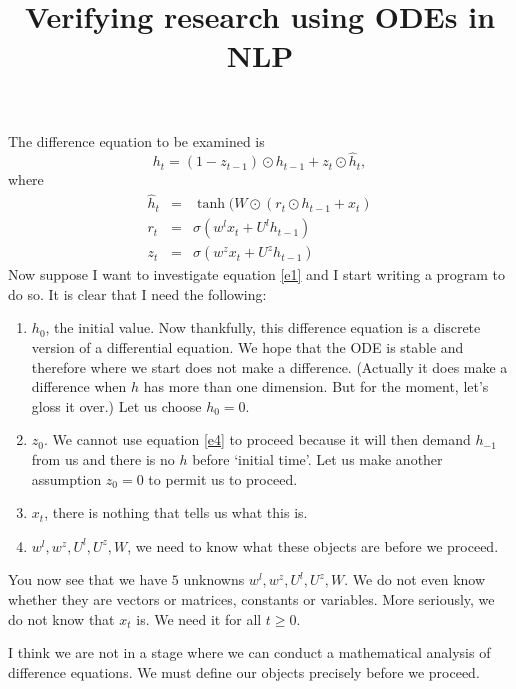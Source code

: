 \documentclass{article}
\begin{document}
\title{Verifying research using ODEs in NLP}
\maketitle
The difference equation to be examined is
\begin{equation}\label{e1}
h_t = (1 - z_{t-1})\odot h_{t-1} + z_t \odot \hat{h}_t,
\end{equation}
where
\begin{eqnarray}
\hat{h}_t &=& \tanh(W \odot (r_t \odot h_{t - 1} + x_t) \label{e2} \\
r_t &=& \sigma\left(w^l x_t + U^l h_{t - 1}\right) \label{e3} \\
z_t &=& \sigma\left(w^z x_t + U^z h_{t - 1}\right) \label{e4}
\end{eqnarray}
Now suppose I want to investigate equation \eqref{e1} and I start writing a
program to do so. It is clear that I need the following:
\begin{enumerate}
\item $h_0$, the initial value. Now thankfully, this difference equation
is a discrete version of a differential equation. We hope that the ODE is
stable and therefore where we start does not make a difference. (Actually
it does make a difference when $h$ has more than one dimension. But for
the moment, let's gloss it over.) Let us choose $h_0 = 0$.
\item $z_0$. We cannot use equation \eqref{e4} to proceed because it will
then demand $h_{-1}$ from us and there is no $h$ before `initial time'. Let
us make another assumption $z_0 = 0$ to permit us to proceed.
\item $x_t$, there is nothing that tells us what this is.
\item $w^l, w^z, U^l, U^z, W$, we need to know what these objects are before
we proceed.
\end{enumerate}
You now see that we have $5$ unknowns $w^l, w^z, U^l, U^z, W$. We do not 
even know whether they are vectors or matrices, constants or variables. 
More seriously, we do not know that $x_t$ is. We need it for all $t \ge 0$.

I think we are not in a stage where we can conduct a mathematical analysis
of difference equations. We must define our objects precisely before we
proceed.
\end{document}
